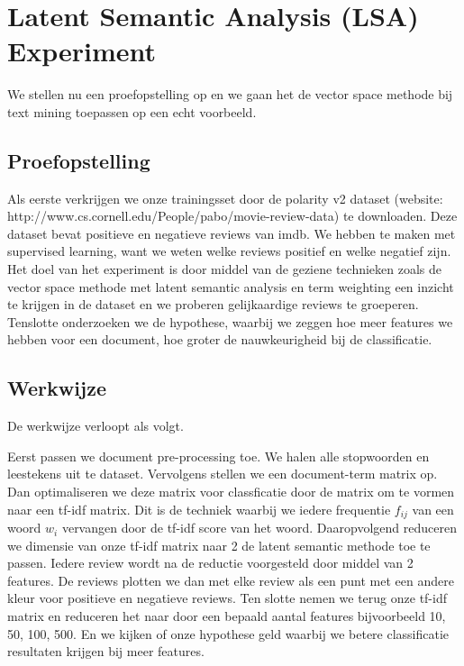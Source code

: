 \section{Latent Semantic Analysis (LSA) Experiment}\label{Latent Semantic Analysis Experiment (LSA) Experiment}

We stellen nu een proefopstelling op en we gaan het de vector space methode bij text mining toepassen op een echt voorbeeld.

\subsection{Proefopstelling}\label{Proefopstelling}
Als eerste verkrijgen we onze trainingsset door de polarity v2 dataset (website: http://www.cs.cornell.edu/People/pabo/movie-review-data) te downloaden. Deze dataset bevat positieve en negatieve reviews van imdb. We hebben te maken met supervised learning, want we weten welke reviews positief en welke negatief zijn. Het doel van het experiment is door middel van de geziene technieken zoals de vector space methode met latent semantic analysis en term weighting een inzicht te krijgen in de dataset en we proberen gelijkaardige reviews te groeperen. Tenslotte onderzoeken we de hypothese, waarbij we zeggen hoe meer features we hebben voor een document, hoe groter de nauwkeurigheid bij de classificatie.


\subsection{Werkwijze}\label{Werkwijze}

De werkwijze verloopt als volgt.

Eerst passen we document pre-processing toe. We halen alle stopwoorden en leestekens uit te dataset. Vervolgens stellen we een document-term matrix op. Dan optimaliseren we deze matrix voor classficatie door de matrix om te vormen naar een tf-idf matrix. Dit is de techniek waarbij we iedere frequentie $f_{ij}$ van een woord $w_{i}$ vervangen door de tf-idf score van het woord. Daaropvolgend reduceren we dimensie van onze tf-idf matrix naar 2 de latent semantic methode toe te passen. Iedere review wordt na de reductie voorgesteld door middel van 2 features. 
De reviews plotten we dan met elke review als een punt met een andere kleur voor positieve en negatieve reviews.
Ten slotte nemen we terug onze tf-idf matrix en reduceren het naar door een bepaald aantal features bijvoorbeeld 10, 50, 100, 500. En we kijken of onze hypothese geld waarbij we betere classificatie resultaten krijgen bij meer features.

